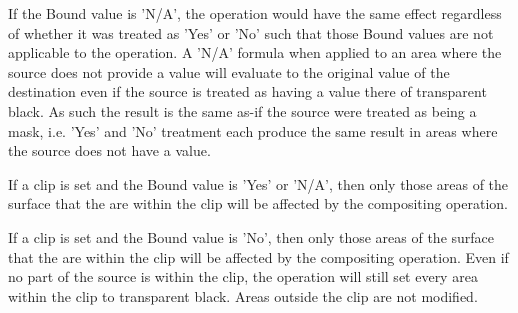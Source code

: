 \pnum
If the Bound value is 'N/A', the operation would have the same effect 
regardless of whether it was treated as 'Yes' or 'No' such that those 
Bound values are not applicable to the operation. A 'N/A' formula when 
applied to an area where the source does not provide a value will evaluate to 
the original value of the destination even if the source is treated as having a 
value there of transparent black. As such the result is the same as-if the 
source were treated as being a mask, i.e. 'Yes' and 'No' treatment each 
produce the same result in areas where the source does not have a value.

\pnum
If a clip is set and the Bound value is 'Yes' or 'N/A', then only those
areas of the surface that the are within the clip will be affected by the
compositing operation.

\pnum
If a clip is set and the Bound value is 'No', then only those areas of
the surface that the are within the clip will be affected by the compositing
operation. Even if no part of the source is within the clip, the operation will
still set every area within the clip to transparent black. Areas outside the
clip are not modified.

